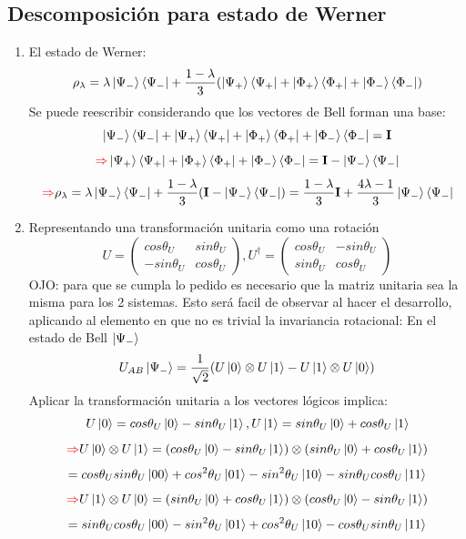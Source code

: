 \documentclass{book}
\begin{document}
\subsection{Descomposición para estado de Werner}
\begin{enumerate}
    \item  El estado de Werner:
    $$\rho_\lambda=\lambda\ket{\Psi_-}\bra{\Psi_-}+\frac{1-\lambda}{3}(\ket{\Psi_+}\bra{\Psi_+}+\ket{\Phi_+}\bra{\Phi_+}+\ket{\Phi_-}\bra{\Phi_-})$$
    Se puede reescribir considerando que los vectores de Bell forman una base:
    $$\ket{\Psi_-}\bra{\Psi_-}+\ket{\Psi_+}\bra{\Psi_+}+\ket{\Phi_+}\bra{\Phi_+}+\ket{\Phi_-}\bra{\Phi_-}=\mathbf{I}$$
    $$ \textcolor{red}{\Rightarrow} \ket{\Psi_+}\bra{\Psi_+}+\ket{\Phi_+}\bra{\Phi_+}+\ket{\Phi_-}\bra{\Phi_-}=\mathbf{I}-\ket{\Psi_-}\bra{\Psi_-}$$
    $$\textcolor{red}{\Rightarrow} \rho_\lambda=\lambda\ket{\Psi_-}\bra{\Psi_-}+\frac{1-\lambda}{3}(\mathbf{I}-\ket{\Psi_-}\bra{\Psi_-})=\frac{1-\lambda}{3}\mathbf{I}+\frac{4\lambda-1}{3}\ket{\Psi_-}\bra{\Psi_-} $$
    \item Representando una transformación unitaria como una rotación
    $$U=\begin{pmatrix}cos\theta_U&sin\theta_U\\-sin\theta_U&cos\theta_U\end{pmatrix}, U^\dag=\begin{pmatrix}cos\theta_U&-sin\theta_U\\sin\theta_U&cos\theta_U\end{pmatrix}$$
     OJO: para que se cumpla lo pedido es necesario que la matriz unitaria sea la misma para los 2 sistemas. Esto será facil de observar al hacer el desarrollo, aplicando al elemento en que no es trivial la invariancia rotacional: En el estado de Bell $ \ket{\Psi_-}$
     $$ U_{AB}\ket{\Psi_-}=\frac{1}{\sqrt{2}}(U\ket{0}\otimes U\ket{1}-U\ket{1}\otimes U\ket{0})$$
     Aplicar la transformación unitaria a los vectores lógicos implica:
     $$ U\ket{0}=cos\theta_U\ket{0}-sin\theta_U\ket{1}, U\ket{1}=sin\theta_U\ket{0}+cos\theta_U\ket{1}$$
     $$\textcolor{red}{\Rightarrow} U\ket{0}\otimes U\ket{1}=(cos\theta_U\ket{0}-sin\theta_U\ket{1})\otimes(sin\theta_U\ket{0}+cos\theta_U\ket{1})$$ $$=cos\theta_U sin\theta_U \ket{00}+cos^2\theta_U\ket{01}-sin^2\theta_U \ket{10}-sin\theta_U cos \theta_U \ket{11}$$
      $$\textcolor{red}{\Rightarrow} U\ket{1}\otimes U\ket{0}=(sin\theta_U\ket{0}+cos\theta_U\ket{1})\otimes(cos\theta_U\ket{0}-sin\theta_U\ket{1})$$ $$=sin\theta_U cos\theta_U \ket{00}-sin^2\theta_U\ket{01}+cos^2\theta_U \ket{10}-cos\theta_U sin \theta_U \ket{11}$$

\end{enumerate}
\end{document}
